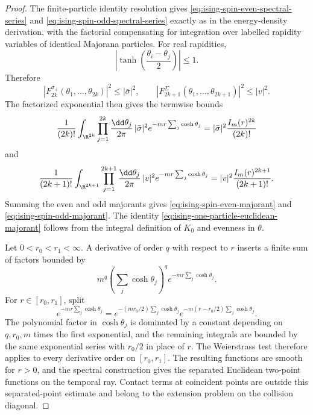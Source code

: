 \begin{proof}
The finite-particle identity resolution gives
\eqref{eq:ising-spin-even-spectral-series} and
\eqref{eq:ising-spin-odd-spectral-series} exactly as in the energy-density
derivation, with the factorial compensating for integration over labelled
rapidity variables of identical Majorana particles.  For real rapidities,
\[
  \left|\tanh\!\left(\frac{\theta_i-\theta_j}{2}\right)\right|
  \le 1 .
\]
Therefore
\begin{equation}
  \left|F_{2k}^{\sigma_+}(\theta_1,\ldots,\theta_{2k})\right|^2
  \le
  |\bar\sigma|^2,
  \qquad
  \left|F_{2k+1}^{\Sigma}(\theta_1,\ldots,\theta_{2k+1})\right|^2
  \le
  |v|^2.
  \label{eq:ising-form-factor-product-majorant}
\end{equation}
The factorized exponential then gives the termwise bounds
\begin{equation}
  \frac{1}{(2k)!}
  \int_{\R^{2k}}\prod_{j=1}^{2k}
  \frac{\dd\theta_j}{2\pi}\,
  |\bar\sigma|^2 e^{-mr\sum_j\cosh\theta_j}
  =
  |\bar\sigma|^2\frac{I_m(r)^{2k}}{(2k)!}
  \label{eq:ising-even-term-majorant}
\end{equation}
and
\begin{equation}
  \frac{1}{(2k+1)!}
  \int_{\R^{2k+1}}\prod_{j=1}^{2k+1}
  \frac{\dd\theta_j}{2\pi}\,
  |v|^2 e^{-mr\sum_j\cosh\theta_j}
  =
  |v|^2\frac{I_m(r)^{2k+1}}{(2k+1)!}.
  \label{eq:ising-odd-term-majorant}
\end{equation}
Summing the even and odd majorants gives
\eqref{eq:ising-spin-even-majorant} and
\eqref{eq:ising-spin-odd-majorant}.  The identity
\eqref{eq:ising-one-particle-euclidean-majorant} follows from the integral
definition of \(K_0\) and evenness in \(\theta\).

Let \(0<r_0<r_1<\infty\).  A derivative of order \(q\) with respect to
\(r\) inserts a finite sum of factors bounded by
\[
  m^q\left(\sum_j\cosh\theta_j\right)^q
  e^{-mr\sum_j\cosh\theta_j}.
\]
For \(r\in[r_0,r_1]\), split
\[
  e^{-mr\sum_j\cosh\theta_j}
  =
  e^{-(mr_0/2)\sum_j\cosh\theta_j}
  e^{-m(r-r_0/2)\sum_j\cosh\theta_j}.
\]
The polynomial factor in \(\cosh\theta_j\) is dominated by a constant
depending on \(q,r_0,m\) times the first exponential, and the remaining
integrals are bounded by the same exponential series with \(r_0/2\) in place
of \(r\).  The Weierstrass test therefore applies to every derivative order
on \([r_0,r_1]\).  The resulting functions are smooth for \(r>0\), and the
spectral construction gives the separated Euclidean two-point functions on
the temporal ray.  Contact terms at coincident points are outside this
separated-point estimate and belong to the extension problem on the
collision diagonal.
\end{proof}

